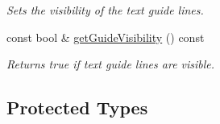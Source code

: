 \begin{DoxyCompactItemize}
\begin{DoxyCompactList}\small\item\em Sets the visibility of the text guide lines. \end{DoxyCompactList}\item 
\hypertarget{class_gui_text_a06ec1fb156ab33fb94beeaa0d74e60c4}{const bool \& \hyperlink{class_gui_text_a06ec1fb156ab33fb94beeaa0d74e60c4}{get\-Guide\-Visibility} () const }\label{class_gui_text_a06ec1fb156ab33fb94beeaa0d74e60c4}

\begin{DoxyCompactList}\small\item\em Returns true if text guide lines are visible. \end{DoxyCompactList}\end{DoxyCompactItemize}
\subsection*{Protected Types}
